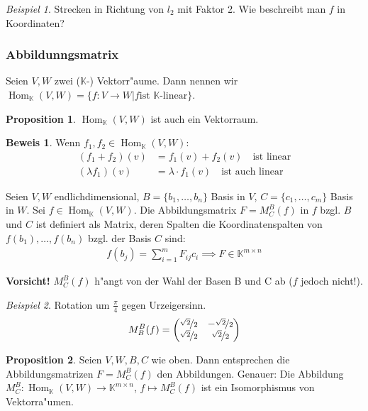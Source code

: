 \documentclass[11pt]{article}
\DeclareMathOperator{\mHom}{Hom}
\theoremstyle{remark}
\newtheorem{exa}{Beispiel}[section]
\theoremstyle{definition}
\newtheorem{prof}{Beweis}
\newtheorem*{proposition}{Proposition}
\theoremstyle{remark}
\begin{document}
\begin{exa}
Strecken in Richtung von \(l_2\) mit Faktor 2. Wie beschreibt man \(f\) in
Koordinaten?
\end{exa}

\subsubsection{Abbildunngsmatrix}
\begin{definition}{}{}
Seien \(V,W\) zwei (\(\mathbb{K}\)-) Vektorr"aume. Dann nennen wir
\(\mHom_\mathbb{K}(V,W) = \{f: V\to W | f \text{ist }\mathbb{K}\text{-linear}\}\).
\end{definition}
\begin{proposition}
\(\mHom_\mathbb{K}(V,W)\) ist auch ein Vektorraum.
\end{proposition}
\begin{prof}
Wenn \(f_1, f_2 \in \mHom_\mathbb{K}(V,W)\):
\begin{align*}
(f_1 + f_2)(v) &= f_1(v) + f_2(v) \quad\text{ist linear} \\
(\lambda f_1)(v) &= \lambda\cdot f_1(v)\quad\text{ist auch linear}
\end{align*}
\end{prof}

Seien \(V, W\) endlichdimensional, \(B = \{b_1, \dots, b_n\}\) Basis in \(V\), \(C = \{c_1, \dots, c_m\}\) Basis in \(W\). Sei \(f \in \mHom_\mathbb{K}(V,W)\). Die Abbildungsmatrix \(F= M_C^B(f)\) in \(f\) bzgl. \(B\) und \(C\) ist definiert als
Matrix, deren Spalten die Koordinatenspalten von \(f(b_1),\dots, f(b_n)\) bzgl. der Basis \(C\) sind:
\begin{align*}
f(b_j) = \sum_{i=1}^mF_{ij}c_i \implies F \in \mathbb{K}^{m\times n}
\end{align*}

\textbf{Vorsicht!} \(M_C^B(f)\) h"angt von der Wahl der Basen B und C ab (\(f\) jedoch nicht!).

\begin{exa}
Rotation um \(\frac{\pi}{4}\) gegen Urzeigersinn.
\begin{align*}
M_B^B(f) = \begin{pmatrix}
\nicefrac{\sqrt{2}}{2} & -\nicefrac{\sqrt{2}}{2}\\
\nicefrac{\sqrt{2}}{2} & \nicefrac{\sqrt{2}}{2}
\end{pmatrix}
\end{align*}
\end{exa}

\begin{proposition} Seien \(V,W,B,C\) wie oben. Dann entsprechen die Abbildungsmatrizen
 \(F = M_C^B(f)\) den Abbildungen.  Genauer: Die Abbildung \(M_C^B: \mHom_\mathbb{K}(V,W)\to\mathbb{K}^{m\times n}\), \(f \mapsto M_C^B(f)\) ist ein Isomorphismus von
 Vektorra"umen.
\end{proposition}
\end{document}
